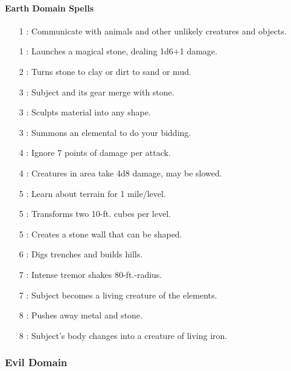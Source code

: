\paragraph{Earth Domain Spells}
\begin{itemize}
\item[1] : Communicate with animals and other unlikely creatures and objects.
\item[1] : Launches a magical stone, dealing 1d6+1 damage.
\item[2] : Turns stone to clay or dirt to sand or mud.
\item[3] : Subject and its gear merge with stone.
\item[3] : Sculpts material into any shape.
\item[3] : Summons an elemental to do your bidding.
\item[4] : Ignore 7 points of damage per attack.
\item[4] : Creatures in area take 4d8 damage, may be slowed.
\item[5] : Learn about terrain for 1 mile/level.
\item[5] : Transforms two 10-ft. cubes per level.
\item[5] : Creates a stone wall that can be shaped.
\item[6] : Digs trenches and builds hills.
\item[7] : Intense tremor shakes 80-ft.-radius.
\item[7] : Subject becomes a living creature of the elements.
\item[8] : Pushes away metal and stone.
\item[8] : Subject's body changes into a creature of living iron.
\end{itemize}
\subsubsection{Evil Domain}

